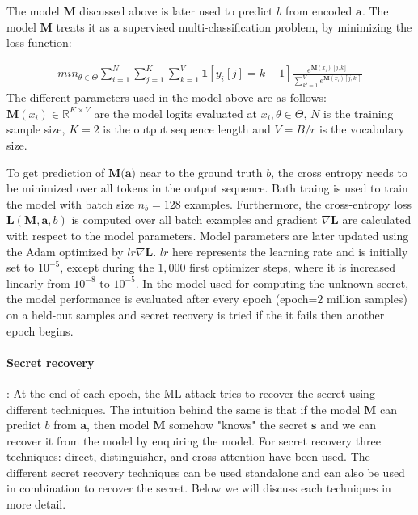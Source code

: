 The model $\textbf{M}$ discussed above is later used to predict $b$ from encoded $\textbf{a}$. The model $\textbf{M}$ treats it as a supervised multi-classification problem, by minimizing the loss function:

\begin{align*}
    min_{\theta \in \Theta} \sum_{i=1}^{N} \sum_{j=1}^{K} \sum_{k=1}^{V} \textbf{1}[y_i[j]=k-1] \frac{e^{\textbf{M}(x_i)[j,k]}} {\sum_{k'=1}^V e^{\textbf{M}(x_i)[j,k']}}
\end{align*}
The different parameters used in the model above are as follows: $\textbf{M}(x_i) \in \mathbb{R}^{K\times V}$ are the model logits evaluated at $x_i, \theta \in \Theta$, $N$ is the training sample size, $K=2$ is the output sequence length and $V=B/r$ is the vocabulary size.

To get prediction of $\textbf{M(a)}$ near to the ground truth $b$, the cross entropy needs to be minimized over all tokens in the output sequence. Bath traing is used to train the model with batch size $n_b=128$ examples. Furthermore, the cross-entropy loss $\textbf{L}(\textbf{M},\textbf{a},b)$ is computed over all batch examples and gradient $\nabla \textbf{L}$ are calculated with respect to the model parameters. Model parameters are later updated using the Adam optimized by $lr \nabla \textbf{L}$. $lr$ here represents the learning rate and is initially set to $10^{-5}$, except during the $1,000$ first optimizer steps, where it is increased linearly from $10^{-8}$ to $10^{-5}$. In the model used for computing the unknown secret, the model performance is evaluated after every epoch (epoch=$2$ million samples) on a held-out samples and secret recovery is tried if the it fails then another epoch begins.


\paragraph{Secret recovery}: At the end of each epoch, the ML attack tries to recover the secret using different techniques. The intuition behind the same is that if the model $\textbf{M}$ can predict $b$ from $\textbf{a}$, then model $\textbf{M}$ somehow "knows" the secret $\textbf{s}$ and we can recover it from the model by enquiring the model. For secret recovery three techniques: direct, distinguisher, and cross-attention have been used. The different secret recovery techniques can be used standalone and can also be used in combination to recover the secret. Below we will discuss each techniques in more detail.

